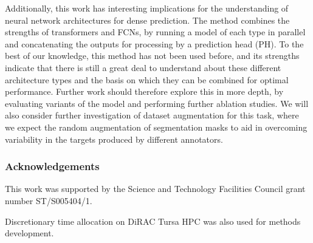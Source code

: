 \documentclass[runningheads]{llncs}
\begin{document}
Additionally, this work has interesting implications for the understanding of neural network architectures for dense prediction. The method combines the strengths of transformers and FCNs, by running a model of each type in parallel and concatenating the outputs for processing by a prediction head (PH). To the best of our knowledge, this method has not been used before, and its strengths indicate that there is still a great deal to understand about these different architecture types and the basis on which they can be combined for optimal performance. Further work should therefore explore this in more depth, by evaluating variants of the model and performing further ablation studies. We will also consider further investigation of dataset augmentation for this task, where we expect the random augmentation of segmentation masks to aid in overcoming variability in the targets produced by different annotators.


\subsubsection{Acknowledgements}
This work was supported by the Science and Technology Facilities Council grant number ST/S005404/1.

Discretionary time allocation on DiRAC Tursa HPC was also used for methods development.



\end{document}
